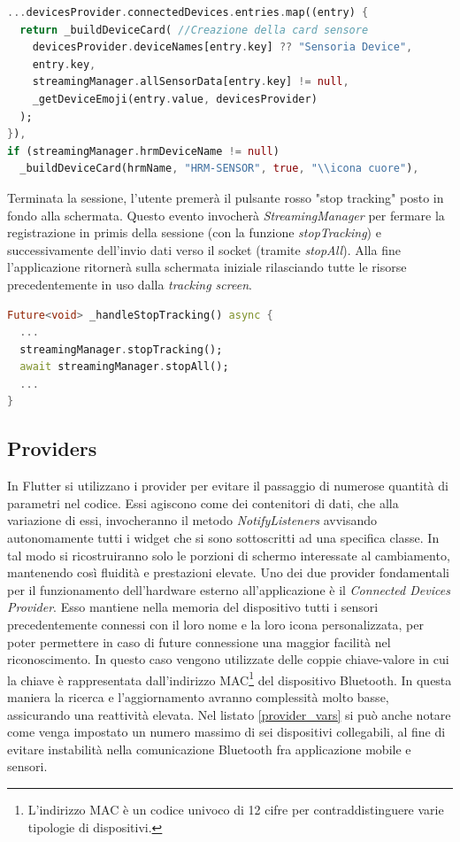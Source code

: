 \documentclass[target=bach,aauheader=,style=]{thud}
\begin{document}
\begin{lstlisting}[language=dart, caption={Generazione delle card relative ai dispositivi BLE connessi.}, label={tracking_sensors}]
...devicesProvider.connectedDevices.entries.map((entry) {
  return _buildDeviceCard( //Creazione della card sensore
    devicesProvider.deviceNames[entry.key] ?? "Sensoria Device", 
    entry.key, 
    streamingManager.allSensorData[entry.key] != null, 
    _getDeviceEmoji(entry.value, devicesProvider)
  );
}),
if (streamingManager.hrmDeviceName != null)
  _buildDeviceCard(hrmName, "HRM-SENSOR", true, "\\icona cuore"),
\end{lstlisting}
Terminata la sessione, l'utente premerà il pulsante rosso "stop tracking" posto in fondo alla schermata. Questo evento invocherà \textit{StreamingManager} per fermare la registrazione in primis della sessione (con la funzione \textit{stopTracking}) e successivamente dell'invio dati verso il socket (tramite \textit{stopAll}). Alla fine l'applicazione ritornerà sulla schermata iniziale rilasciando tutte le risorse precedentemente in uso dalla \textit{tracking screen}.

\begin{lstlisting}[language=dart, caption={Procedura di arresto degli stream dati e chiusura della sessione.}, label={tracking_stop}]
Future<void> _handleStopTracking() async {
  ...
  streamingManager.stopTracking();
  await streamingManager.stopAll();
  ...
}
\end{lstlisting}

\subsection{Providers}
In Flutter si utilizzano i provider per evitare il passaggio di numerose quantità di parametri nel codice. Essi agiscono come dei contenitori di dati, che alla variazione di essi, invocheranno il metodo \textit{NotifyListeners} avvisando autonomamente tutti i widget che si sono sottoscritti ad una specifica classe. In tal modo si ricostruiranno solo le porzioni di schermo interessate al cambiamento, mantenendo così fluidità e prestazioni elevate.
Uno dei due provider fondamentali per il funzionamento dell'hardware esterno all'applicazione è il \textit{Connected Devices Provider}. Esso mantiene nella memoria del dispositivo tutti i sensori precedentemente connessi con il loro nome e la loro icona personalizzata, per poter permettere in caso di future connessione una maggior facilità nel riconoscimento. In questo caso vengono utilizzate delle coppie chiave-valore in cui la chiave è rappresentata dall'indirizzo MAC\footnote{L'indirizzo MAC è un codice univoco di 12 cifre per contraddistinguere varie tipologie di dispositivi.} del dispositivo Bluetooth. In questa maniera la ricerca e l'aggiornamento avranno complessità molto basse, assicurando una reattività elevata. Nel listato \ref{provider_vars} si può anche notare come venga impostato un numero massimo di sei dispositivi collegabili, al fine di evitare instabilità nella comunicazione Bluetooth fra applicazione mobile e sensori. 
\end{document}
